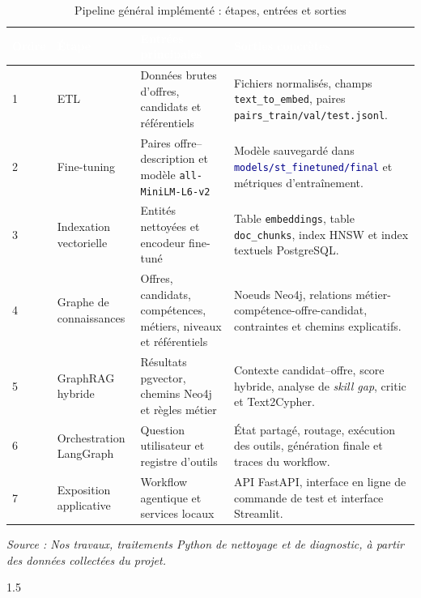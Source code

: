 \documentclass[12pt,twoside]{report}
\newcommand{\source}[1]{%
  \par\vspace{0.2\baselineskip}
  {\centering\footnotesize\itshape Source : #1\par}
}
\newcommand{\filevar}[1]{\texttt{\textcolor{darkblue}{#1}}}
\newcommand{\tabheader}[1]{\textcolor{white}{\textbf{#1}}}
\newcommand{\tableStyleStart}{%
  \small
  \renewcommand{\arraystretch}{1.12}%
  \setlength{\tabcolsep}{4pt}%
  \rowcolors{2}{lightblue!12}{white}%
}
\newcommand{\tableStyleEnd}{%
  \rowcolors{2}{}{}%
  \renewcommand{\arraystretch}{1}%
}
\let\OldTableOfContents\tableofcontents
\renewcommand{\tableofcontents}{%
  \begingroup
  \onehalfspacing
  \setlength{\parskip}{0pt}
  \OldTableOfContents
  \endgroup
}
\begin{document}
\begin{table}[H]
	\centering
	\caption{Pipeline général implémenté : étapes, entrées et sorties}
	\label{tab:pipeline_general_implementation}
	\tableStyleStart
	\begin{tabularx}{\textwidth}{p{0.8cm}p{3.0cm}p{4.3cm}X}
		\rowcolor{darkblue}
		\tabheader{Ordre} & \tabheader{Étape} & \tabheader{Entrées principales} & \tabheader{Sorties concrètes} \\
		\midrule
		1 & ETL & Données brutes d'offres, candidats et référentiels & Fichiers normalisés, champs \texttt{text\_to\_embed}, paires \texttt{pairs\_train/val/test.jsonl}. \\
		2 & Fine-tuning & Paires offre--description et modèle \texttt{all-MiniLM-L6-v2} & Modèle sauvegardé dans \filevar{models/st\_finetuned/final} et métriques d'entraînement. \\
		3 & Indexation vectorielle & Entités nettoyées et encodeur fine-tuné & Table \texttt{embeddings}, table \texttt{doc\_chunks}, index HNSW et index textuels PostgreSQL. \\
		4 & Graphe de connaissances & Offres, candidats, compétences, métiers, niveaux et référentiels & Noeuds Neo4j, relations métier-compétence-offre-candidat, contraintes et chemins explicatifs. \\
		5 & GraphRAG hybride & Résultats pgvector, chemins Neo4j et règles métier & Contexte candidat--offre, score hybride, analyse de \textit{skill gap}, critic et Text2Cypher. \\
		6 & Orchestration LangGraph & Question utilisateur et registre d'outils & État partagé, routage, exécution des outils, génération finale et traces du workflow. \\
		7 & Exposition applicative & Workflow agentique et services locaux & API FastAPI, interface en ligne de commande de test et interface Streamlit. \\
		\bottomrule
	\end{tabularx}
	\tableStyleEnd
	\source{Nos travaux, traitements Python de nettoyage et de diagnostic, à partir des données collectées du projet.}
\end{table}


\begin{spacing}{1.5}
\tableofcontents %
\end{spacing}
\end{document}
